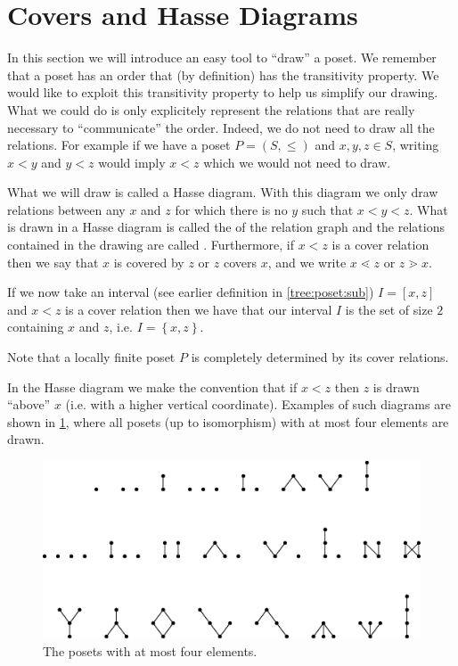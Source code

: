 \section{Covers and Hasse Diagrams}
\label{tree:poset:hasse}


In this section we will introduce an easy tool to ``draw'' a poset. We remember that a poset has an order that (by definition) has the transitivity property. We would like to exploit this transitivity property to help us simplify our drawing. What we could do is only explicitely represent the relations that are really necessary to ``communicate'' the order. Indeed, we do not need to draw all the relations. For example if we have a poset $P = (S, \le)$ and $x, y, z \in S$, writing $x < y$ and $y < z$ would imply $x < z$ which we would not need to draw.


What we will draw is called a Hasse diagram. With this diagram we only draw relations between any $x$ and $z$ for which there is no $y$ such that $x < y < z$. 
What is drawn in a Hasse diagram is called the  of the relation graph and the relations contained in the drawing are called . Furthermore, if $x < z$ is a cover relation then we say that $x$ is covered by $z$ or $z$ covers $x$, and we write $x \lessdot z$ or $z \gtrdot x$.


If we now take an interval (see earlier definition in \ref{tree:poset:sub}) $I = [x, z]$ and $x < z$ is a cover relation then we have that our interval $I$ is the set of size $2$ containing $x$ and $z$, i.e. $I = \left\{{x, z}\right\}$.

Note that a locally finite poset $P$ is completely determined by its cover relations.

In the Hasse diagram we make the convention that if $x < z$ then $z$ is drawn ``above'' $x$ (i.e. with a higher vertical coordinate). Examples of such diagrams are shown in \ref{fig:stanley:3-1}, where all posets (up to isomorphism) with at most four elements are drawn.


\begin{figure}
	\centering
	\includegraphics[width=\textwidth]{fig/stanley/3-1}
	\caption{\label{fig:stanley:3-1} The posets with at most four elements. \cite{Stanley:2011:ECV:2124415}}
\end{figure}


